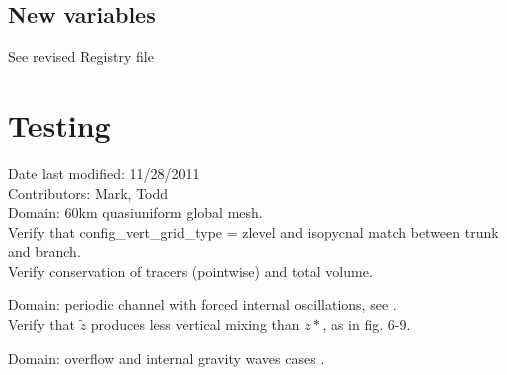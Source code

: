 \documentclass[11pt]{report}
\begin{document}
\section{New variables}
See revised Registry file


\chapter{Testing}
Date last modified: 11/28/2011 \\
Contributors: Mark, Todd \\

Domain: 60km quasiuniform global mesh.\\
Verify that config\_vert\_grid\_type = zlevel and isopycnal match between trunk and branch.\\
Verify conservation of tracers (pointwise) and total volume.

Domain: periodic channel with forced internal oscillations, see \citep{Leclair_Madec11om}.\\
Verify that ${\tilde z}$ produces less vertical mixing than $z*$, as in fig. 6-9.


Domain: overflow and internal gravity waves cases \citep{Ilicak_ea12om}.





%
%

\end{document}
